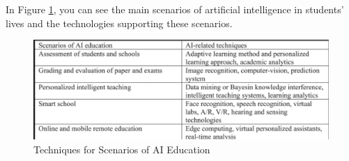 \documentclass[a4paper,12pt]{article}
\begin{document}
In Figure \ref{fig:enter-label}, you can see the main scenarios of artificial intelligence in students' lives and the technologies supporting these scenarios.
\begin{figure}
     \includegraphics[scale=0.8]{figure1.png}
     \caption{Techniques for Scenarios of AI Education \cite{ArtificialInInEd}}
     \label{fig:enter-label}
 \end{figure}

\end{document}
